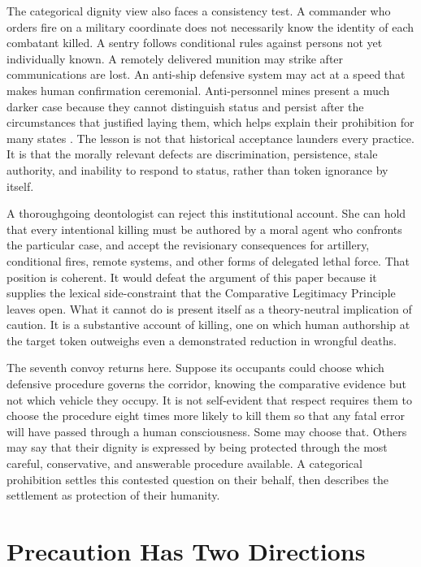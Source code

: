 \documentclass[11pt]{article}
\begin{document}
The categorical dignity view also faces a consistency test. A commander who orders fire on a military coordinate does not necessarily know the identity of each combatant killed. A sentry follows conditional rules against persons not yet individually known. A remotely delivered munition may strike after communications are lost. An anti-ship defensive system may act at a speed that makes human confirmation ceremonial. Anti-personnel mines present a much darker case because they cannot distinguish status and persist after the circumstances that justified laying them, which helps explain their prohibition for many states \citep{mineban1997}. The lesson is not that historical acceptance launders every practice. It is that the morally relevant defects are discrimination, persistence, stale authority, and inability to respond to status, rather than token ignorance by itself.

A thoroughgoing deontologist can reject this institutional account. She can hold that every intentional killing must be authored by a moral agent who confronts the particular case, and accept the revisionary consequences for artillery, conditional fires, remote systems, and other forms of delegated lethal force. That position is coherent. It would defeat the argument of this paper because it supplies the lexical side-constraint that the Comparative Legitimacy Principle leaves open. What it cannot do is present itself as a theory-neutral implication of caution. It is a substantive account of killing, one on which human authorship at the target token outweighs even a demonstrated reduction in wrongful deaths.

The seventh convoy returns here. Suppose its occupants could choose which defensive procedure governs the corridor, knowing the comparative evidence but not which vehicle they occupy. It is not self-evident that respect requires them to choose the procedure eight times more likely to kill them so that any fatal error will have passed through a human consciousness. Some may choose that. Others may say that their dignity is expressed by being protected through the most careful, conservative, and answerable procedure available. A categorical prohibition settles this contested question on their behalf, then describes the settlement as protection of their humanity.

\section{Precaution Has Two Directions}
\label{sec:precaution}
\end{document}

